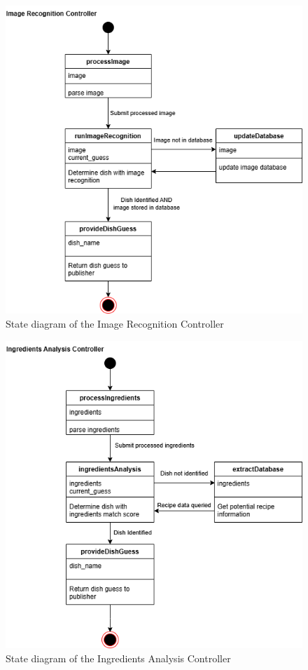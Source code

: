 \documentclass[]{article}
\begin{document}
\begin{figure}[H]
	\centering
	\includegraphics[width=\textwidth]{image/D3_state_diagrams/image_recognition.png}
	\caption{State diagram of the Image Recognition Controller}
	\label{fig:image_recognition_controller}
\end{figure}

\begin{figure}[H]
	\centering
	\includegraphics[width=\textwidth]{image/D3_state_diagrams/ingredients_analysis.png}
	\caption{State diagram of the Ingredients Analysis Controller}
	\label{fig:ingredients_analysis_controller}
\end{figure}
\end{document}
